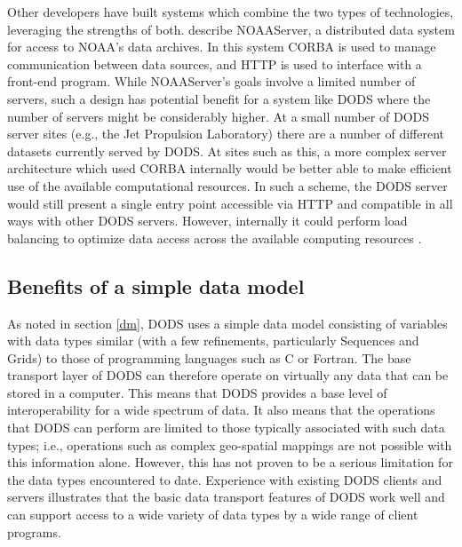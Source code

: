 \documentclass[12pt]{article}
\begin{document}
Other developers have built systems which combine the two types of
technologies, leveraging the strengths of both.
 describe \acs{NOAA}Server, a distributed data
system for access to \acs{NOAA}'s data archives. In this system \ac{CORBA} is
used to manage communication between data sources, and \acs{HTTP} is used to
interface with a front-end program. While \acs{NOAA}Server's goals involve a
limited number of servers, such a design has potential benefit for a system
like \ac{DODS} where the number of servers might be considerably higher. At a
small number of \ac{DODS} server sites (e.g., the Jet Propulsion Laboratory)
there are a number of different datasets currently served by \ac{DODS}. At
sites such as this, a more complex server architecture which used \ac{CORBA}
internally would be better able to make efficient use of the available
computational resources. In such a scheme, the \ac{DODS} server would still
present a single entry point accessible via \acs{HTTP} and compatible in all
ways with other \ac{DODS} servers. However, internally it could perform load
balancing to optimize data access across the available computing resources
\cite{hamby:private-comm}.

\subsection{Benefits of a simple data model}
\label{ddm}

As noted in section \ref{dm}, \ac{DODS} uses a simple data model consisting
of variables with data types similar (with a few refinements, particularly
Sequences and Grids) to those of programming languages such as C or Fortran.
The base transport layer of \ac{DODS} can therefore operate on virtually
any data that can be stored in a computer. This means that \ac{DODS} provides a base
level of interoperability for a wide spectrum of data. It also means that the
operations that \ac{DODS} can perform are limited to those typically
associated with such data types; i.e., operations such as complex geo-spatial
mappings are not possible with this information alone. However, this has not
proven to be a serious limitation for the data types encountered to date.
Experience with existing \ac{DODS} clients and servers illustrates that the
basic data transport features of \ac{DODS} work well and can support access
to a wide variety of data types by a wide range of client programs.
\end{document}
